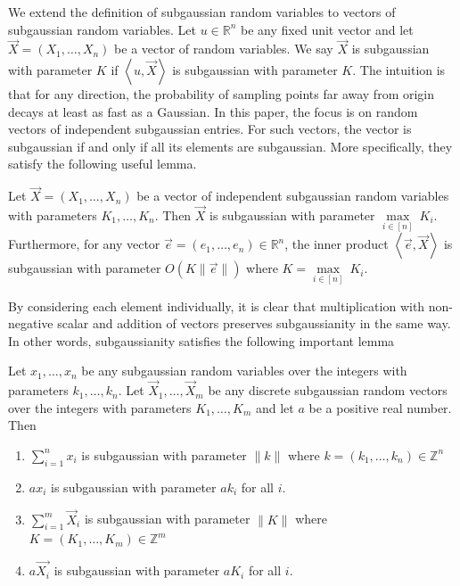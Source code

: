 We extend the definition of subgaussian random variables to vectors of subgaussian random variables. Let $u \in \mathbb{R}^n$ be any fixed unit vector and let $\vec{X} = (X_1, \dots, X_n)$ be a vector of random variables. We say $\vec{X}$ is subgaussian with parameter $K$ if $\left\langle u,\vec{X} \right\rangle$ is subgaussian with parameter $K$. The intuition is that for any direction, the probability of sampling points far away from origin decays at least as fast as a Gaussian. In this paper, the focus is on random vectors of independent subgaussian entries. For such vectors, the vector is subgaussian if and only if all its elements are subgaussian. More specifically, they satisfy the following useful lemma.
\begin{lemma}\label{lemma:Ver12}
    Let $\vec{X} = (X_1, \dots, X_n)$ be a vector of independent subgaussian random variables with parameters $K_1, \dots, K_n$. Then $\vec{X}$ is subgaussian with parameter $\underset{i \in [n]}{\max} \ K_i$. Furthermore, for any vector $\vec{e} = (e_1, \dots, e_n) \in \mathbb{R}^n$, the inner product $\left\langle \vec{e}, \vec{X} \right\rangle$ is subgaussian with parameter $O(K\|\vec{e}\|)$ where $K = \underset{i \in [n]}{\max} \ K_i$. 
\end{lemma}
By considering each element individually, it is clear that multiplication with non-negative scalar and addition of vectors preserves subgaussianity in the same way. In other words, subgaussianity satisfies the following important lemma
\begin{lemma}\label{lemma:add-subgaussian}
    Let $x_1, \dots, x_n$ be any subgaussian random variables over the integers with parameters $k_1, \dots, k_n$. Let $\vec{X}_1, \dots, \vec{X}_m$ be any discrete subgaussian random vectors over the integers with parameters $K_1, \dots, K_m$ and let $a$ be a positive real number. Then
    \begin{enumerate}
        \item $\sum_{i=1}^n x_i$ is subgaussian with parameter $\|k\|$ where $k = (k_1, \dots, k_n) \in \mathbb{Z}^n$
        \item $ax_i$ is subgaussian with parameter $ak_i$ for all $i$.
        \item $\sum_{i=1}^m \vec{X}_i$ is subgaussian with parameter $\|K\|$ where $K = (K_1, \dots, K_m) \in \mathbb{Z}^m$
        \item $a\vec{X_i}$ is subgaussian with parameter $aK_i$ for all $i$.
    \end{enumerate}
\end{lemma}
